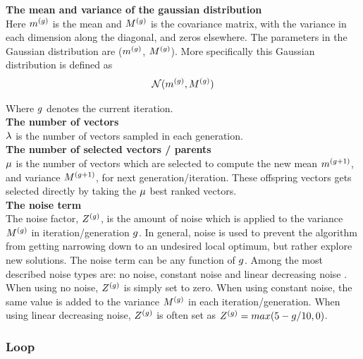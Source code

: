 \textbf{The mean and variance of the gaussian distribution} \\
Here $m^{(g)}$ is the mean and  
$M^{(g)}$ is the covariance matrix, with 
the variance in each dimension along the diagonal, and zeros elsewhere. 
The parameters in the Gaussian distribution are ($m^{(g)}$,
$M^{(g)}$). 
More specifically this Gaussian distribution is defined as 
\begin{align}
\mathcal{N}(m^{(g)},M^{(g)})
\end{align}

Where $g$ denotes the current iteration.\\


\textbf{The number of vectors}\\
$\lambda$ is the number of vectors sampled in each generation.
\\

\textbf{The number of selected vectors / parents}\\
$\mu$ is the number of vectors which are selected to compute 
the new mean $m^{(g + 1)}$, and variance
$M^{(g + 1)}$, for next generation/iteration. 
These offspring vectors gets selected 
directly by taking the $\mu$ best ranked
vectors.
\\

\textbf{The noise term}\\
The noise factor, $Z^{(g)}$, 
is the amount of noise which 
is applied to the variance $M^{(g)}$ in
iteration/generation 
$g$. In general, noise is used to prevent
the algorithm from 
getting narrowing down to an undesired local optimum, but
rather explore new solutions.
The noise term can be any
function of $g$. Among 
the most described noise types are: no noise, constant noise 
and linear decreasing noise \citep{szita:06}. 
When using no noise, $Z^{(g)}$ 
is simply set to zero. When using constant noise, 
the same value is 
added to the variance $M^{(g)}$ 
in each iteration/generation. 
When using linear decreasing noise, 
$Z^{(g)}$ is often set as
$Z^{(g)}=max(5- g /10,0)$.
\\

\subsubsection{Loop}


